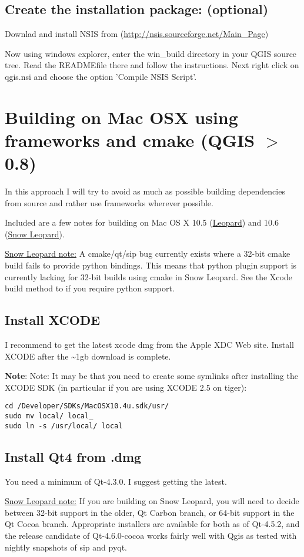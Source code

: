 \subsection{Create the installation package: (optional)}
Downlad and install NSIS from (\url{http://nsis.sourceforge.net/Main\_Page})

Now using windows explorer, enter the win\_build directory in your QGIS source
tree. Read the READMEfile there and follow the instructions. Next right click
on qgis.nsi and choose the option 'Compile NSIS Script'. 


\section{Building on Mac OSX using frameworks and cmake (QGIS $>$ 0.8)}
In this approach I will try to avoid as much as possible building dependencies
from source and rather use frameworks wherever possible.

Included are a few notes for building on Mac OS X 10.5 (\underline{Leopard}) and 10.6 
(\underline{Snow Leopard}). 

\underline{Snow Leopard note:} A cmake/qt/sip bug currently exists where a 32-bit
cmake build fails to provide python bindings. This means that python plugin support
is currently lacking for 32-bit builds using cmake in Snow Leopard. See the Xcode
build method to if you require python support.

\subsection{Install XCODE}
I recommend to get the latest xcode dmg from the Apple XDC Web site. Install
XCODE after the \~{}1gb download is complete.

\textbf{Note}:   Note: It may be that you need to create some symlinks after installing 
the XCODE SDK (in particular if you are using XCODE 2.5 on tiger):

\begin{verbatim}
cd /Developer/SDKs/MacOSX10.4u.sdk/usr/
sudo mv local/ local_
sudo ln -s /usr/local/ local
\end{verbatim}

\subsection{Install Qt4 from .dmg}
You need a minimum of Qt-4.3.0. I suggest getting the latest.

\underline{Snow Leopard note:} If you are building on Snow Leopard, you will need to
decide between 32-bit support in the older, Qt Carbon branch, or 64-bit
support in the Qt Cocoa branch. Appropriate installers are available for both
as of Qt-4.5.2, and the release candidate of Qt-4.6.0-cocoa works fairly well
with Qgis as tested with nightly snapshots of sip and pyqt.

